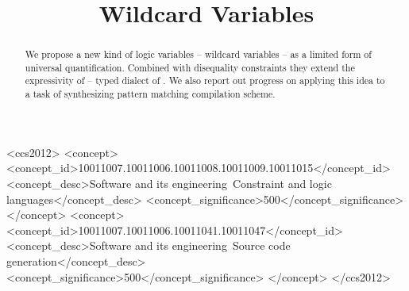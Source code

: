 \documentclass[acmlarge
  , review
  , nonacm=false]
  {acmart}
\begin{document}
\title[xxx]{Wildcard Variables}





%

\begin{abstract}
We propose a new kind of logic variables -- wildcard variables -- as a limited form of universal quantification. Combined with disequality constraints they extend the expressivity of \OCanren{} -- typed dialect of \miniKanren{}. We also report out progress on applying this idea to a task of synthesizing pattern matching compilation scheme.
\end{abstract}


\begin{CCSXML}
<ccs2012>
<concept>
<concept_id>10011007.10011006.10011008.10011009.10011015</concept_id>
<concept_desc>Software and its engineering~Constraint and logic languages</concept_desc>
<concept_significance>500</concept_significance>
</concept>
<concept>
<concept_id>10011007.10011006.10011041.10011047</concept_id>
<concept_desc>Software and its engineering~Source code generation</concept_desc>
<concept_significance>500</concept_significance>
</concept>
</ccs2012>
\end{CCSXML}

\end{document}
